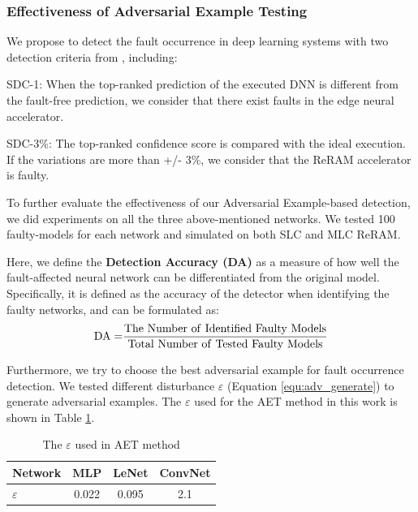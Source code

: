 \subsubsection{Effectiveness of Adversarial Example Testing}
We propose to detect the fault occurrence in deep learning systems with two detection criteria from \cite{Li:2017:UEP:3126908.3126964}, including:

SDC-1: When the top-ranked prediction of the executed DNN is different from the fault-free prediction, we consider that there exist faults in the edge neural accelerator. 

SDC-3\%: The top-ranked confidence score is compared with the ideal execution. If the variations are more than +/- 3\%, we consider that the ReRAM accelerator is faulty.  

To further evaluate the effectiveness of our Adversarial Example-based detection, we did experiments on all the three above-mentioned networks. We tested 100 faulty-models for each network and simulated on both SLC and MLC ReRAM.

Here, we define the {\bf Detection Accuracy (DA)} as a measure of how well the fault-affected neural network can be differentiated from the original model. Specifically, it is defined as the accuracy of the detector when identifying the faulty networks, and can be formulated as:
\begin{equation}
    {\rm{DA = }}\frac{{{\rm{The\ Number\ of\ Identified\ Faulty\ Models}}}}{{{\rm{Total\ Number\ of\ Tested\ Faulty\  Models}}}}
\end{equation}


Furthermore, we try to choose the best adversarial example for fault occurrence detection.  We tested different disturbance $\varepsilon$ (Equation \ref{equ:adv_generate})  to generate adversarial examples. The  $\varepsilon$ used for the AET method in this work is shown in Table \ref{tab:disturbance}.
\begin{table}
    \centering
    \caption{The $\varepsilon$ used in AET method}
    \label{tab:disturbance}
    \begin{tabular}{lccc}
        \toprule
        Network & MLP& LeNet & ConvNet\\
        \midrule
        $\varepsilon$&0.022&0.095&2.1\\
        \bottomrule
    \end{tabular}
\end{table}


